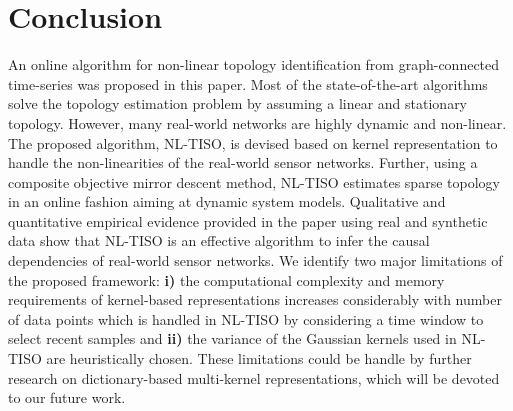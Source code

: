 \documentclass[conference]{IEEEtran}
\begin{document}
\section{Conclusion}
An online algorithm for non-linear topology identification from graph-connected time-series was proposed in this paper. Most of the state-of-the-art algorithms solve the topology estimation problem by assuming a linear and stationary topology. However, many real-world networks are highly dynamic and non-linear. The proposed algorithm, NL-TISO, is devised based on kernel representation to handle the non-linearities of the real-world sensor networks. Further, using a composite objective mirror descent method, NL-TISO estimates sparse topology in an online fashion aiming at dynamic system models. Qualitative and quantitative empirical evidence provided in the paper using real and synthetic data show that NL-TISO is an effective algorithm to infer the causal dependencies of real-world sensor networks. We identify two major limitations of the proposed framework: \textbf{i)} the computational complexity and memory requirements of kernel-based representations increases considerably with number of data points which is handled in NL-TISO by considering a time window to select recent samples and \textbf{ii)} the variance of the Gaussian kernels used in NL-TISO are heuristically chosen. These limitations could be handle by further research on dictionary-based multi-kernel representations, which will be devoted to our future work.






\vspace{12pt}




\end{document}
